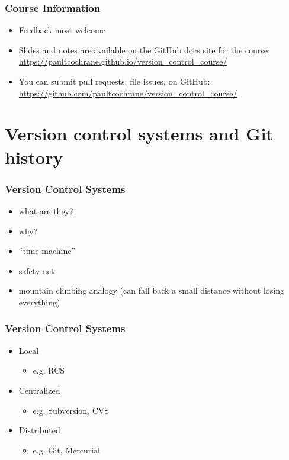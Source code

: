 \documentclass{git_course}
\begin{document}
\begin{frame}
\frametitle{Course Information}
\begin{itemize}
    \item Feedback most welcome
    \item Slides and notes are available on the GitHub docs site for the
        course:\\
        {\footnotesize \url{https://paultcochrane.github.io/version\_control\_course/}}
    \item You can submit pull requests, file issues, on GitHub:\\
        {\footnotesize \url{https://github.com/paultcochrane/version\_control\_course/}}
\end{itemize}
\end{frame}


\section{Version control systems and Git history}

\begin{frame}
\frametitle{Version Control Systems}
\begin{itemize}
    \item what are they?
    \item why?
    \item ``time machine''
    \item safety net
    \item mountain climbing analogy (can fall back a small distance without
        losing everything)
\end{itemize}
\end{frame}

\begin{frame}
\frametitle{Version Control Systems}
\begin{itemize}
    \item Local
    \begin{itemize}
        \item e.g. RCS
    \end{itemize}
    \item Centralized
    \begin{itemize}
        \item e.g. Subversion, CVS
    \end{itemize}
    \item Distributed
    \begin{itemize}
        \item e.g. Git, Mercurial
    \end{itemize}
\end{itemize}
\end{frame}
\end{document}
